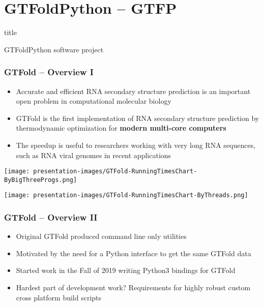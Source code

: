 \documentclass[usenames,svgnames,dvipsnames,11pt]{beamer}
\newcommand{\TitleBoxed}[1]{
     \begin{beamercolorbox}[sep=8pt,center,shadow=true,rounded=true]{title}
          \usebeamerfont{title}#1\par%
     \end{beamercolorbox}
}
\begin{document}
\section{GTFoldPython -- GTFP}

\begin{frame}
\TitleBoxed{
     \Huge{\centerline{GTFoldPython software project}}
}
\end{frame}

\begin{frame}
\frametitle{GTFold -- Overview I}

\begin{itemize} 

\item Accurate and efficient RNA secondary structure prediction is an important 
      open problem in computational molecular biology 
\item GTFold is the first implementation of RNA secondary structure prediction by thermodynamic
	optimization for \textbf{modern multi-core computers}
\item The speedup is useful to researchers working with very long 
      RNA sequences, such as RNA viral genomes in recent applications

\end{itemize}

\begin{minipage}{0.5\textwidth}
\begin{center}
\texttt{[image: presentation-images/GTFold-RunningTimesChart-ByBigThreeProgs.png]} \\ 
\end{center}
\end{minipage}\hfil
\begin{minipage}{0.5\textwidth}
\begin{center}
\texttt{[image: presentation-images/GTFold-RunningTimesChart-ByThreads.png]} \\ 
\end{center}
\end{minipage}

\end{frame}

\begin{frame}
\frametitle{GTFold -- Overview II}

\begin{itemize} 

\item Original GTFold produced command line only utilities 
\item Motivated by the need for a Python interface to get the same GTFold data 
\item Started work in the Fall of 2019 writing Python3 bindings for GTFold 
\item Hardest part of development work? Requirements for highly robust custom 
      cross platform build scripts 

\end{itemize}

\end{frame}
\end{document}
